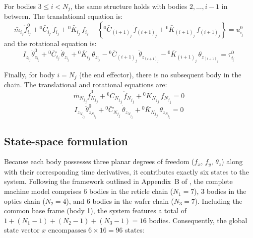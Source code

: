 For bodies $3\leq i< N_j$, the same structure holds with bodies $2, \dots, i-1$ in between. The translational equation is:
\begin{equation}
        \bar{m}_{i_j}
        \ddot{f}^{0}_{i_j}
        + {}^0\bar{C}_{i_j}\,\dot{f}_{i_j}
        + {}^0\bar{K}_{i_j}\,f_{i_j}
        -
        \left\{
            {}^0\bar{C}_{(i+1)_j}\,\dot{f}_{(i+1)_j} + {}^0\bar{K}_{(i+1)_j}\,f_{(i+1)_j}
        \right\}
        = u^0_{i_j}
\end{equation}
and the rotational equation is:
\begin{equation}
        I_{z_{i_j}}\ddot{\theta}^{0}_{z_{i_j}}
        + {}^0\bar{C}_{i_j}\,\dot{\theta}_{z_{i_j}}
        + {}^0\bar{K}_{i_j}\,\theta_{z_{i_j}}
        - {}^0\bar{C}_{(i+1)_j}\,\dot{\theta}_{z_{(i+1)_j}}
        - {}^0\bar{K}_{(i+1)_j}\,\theta_{z_{(i+1)_j}}
        = \tau^0_{i_j}
\end{equation}

Finally, for body $i = N_j$ (the end effector), there is no subsequent body in the chain. The translational and rotational equations are:
\begin{equation}
        \bar{m}_{{N_j}_j}
        \ddot{f}^{0}_{{N_j}_j}
        + {}^0\bar{C}_{{N_j}_j}\,\dot{f}_{{N_j}_j}
        + {}^0\bar{K}_{{N_j}_j}\,f_{{N_j}_j}
        = 0
\end{equation}
\begin{equation}
        I_{z_{{N_j}_j}}\ddot{\theta}^{0}_{z_{{N_j}_j}}
        + {}^0\bar{C}_{{N_j}_j}\,\dot{\theta}_{z_{{N_j}_j}}
        + {}^0\bar{K}_{{N_j}_j}\,\theta_{z_{{N_j}_j}}
        = 0
\end{equation}

\subsection{State-space formulation}

Because each body possesses three planar degrees of freedom ($f_x$, $f_y$, $\theta_z$) along with their corresponding time derivatives, it contributes exactly six states to the system. Following the framework outlined in Appendix~B of \cite{Al-Rawashdeh2022_Caracterization}, the complete machine model comprises 6 bodies in the reticle chain ($N_1 = 7$), 3 bodies in the optics chain ($N_2 = 4$), and 6 bodies in the wafer chain ($N_3 = 7$). Including the common base frame (body 1), the system features a total of $1 + (N_1-1) + (N_2-1) + (N_3-1) = 16$ bodies. Consequently, the global state vector $x$ encompasses $6 \times 16 = 96$ states:

